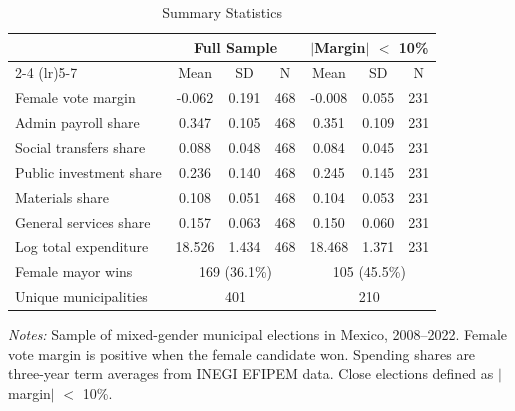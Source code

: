 \begin{table}[htbp]
\centering
\begin{threeparttable}
\caption{Summary Statistics}
\label{tab:sumstats}
\begin{tabular}{lcccccc}
\toprule
 & \multicolumn{3}{c}{Full Sample} & \multicolumn{3}{c}{$|$Margin$|$ $<$ 10\%} \\
\cmidrule(lr){2-4} \cmidrule(lr){5-7}
 & Mean & SD & N & Mean & SD & N \\
\midrule
Female vote margin & -0.062 & 0.191 & 468 & -0.008 & 0.055 & 231 \\
Admin payroll share & 0.347 & 0.105 & 468 & 0.351 & 0.109 & 231 \\
Social transfers share & 0.088 & 0.048 & 468 & 0.084 & 0.045 & 231 \\
Public investment share & 0.236 & 0.140 & 468 & 0.245 & 0.145 & 231 \\
Materials share & 0.108 & 0.051 & 468 & 0.104 & 0.053 & 231 \\
General services share & 0.157 & 0.063 & 468 & 0.150 & 0.060 & 231 \\
Log total expenditure & 18.526 & 1.434 & 468 & 18.468 & 1.371 & 231 \\
\midrule
Female mayor wins & \multicolumn{3}{c}{169 (36.1\%)} & \multicolumn{3}{c}{105 (45.5\%)} \\
Unique municipalities & \multicolumn{3}{c}{401} & \multicolumn{3}{c}{210} \\
\bottomrule
\end{tabular}
\begin{tablenotes}[flushleft]
\small
\item \textit{Notes:} Sample of mixed-gender municipal elections in Mexico, 2008--2022. Female vote margin is positive when the female candidate won. Spending shares are three-year term averages from INEGI EFIPEM data. Close elections defined as $|$margin$|$ $<$ 10\%.
\end{tablenotes}
\end{threeparttable}
\end{table}
